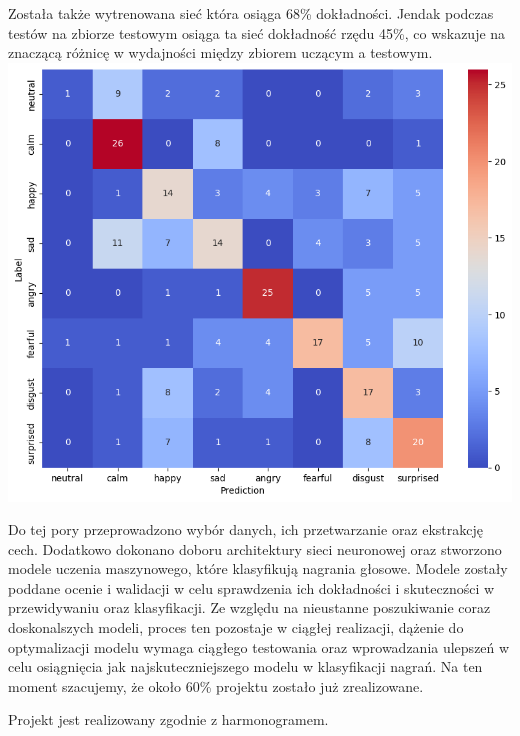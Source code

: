 \documentclass[12pt,titlepage]{article}
\begin{document}
Została także wytrenowana sieć która osiąga 68\% dokładności. Jendak podczas testów na zbiorze testowym osiąga ta sieć dokładność rzędu 45\%, co wskazuje na znaczącą różnicę w wydajności między zbiorem uczącym a testowym.\\

\includegraphics[width=\linewidth]{img/error_matrix.png}

Do tej pory przeprowadzono wybór danych, ich przetwarzanie oraz ekstrakcję cech. Dodatkowo dokonano doboru architektury sieci neuronowej oraz stworzono modele uczenia maszynowego, które klasyfikują nagrania głosowe. Modele zostały poddane ocenie i walidacji w celu sprawdzenia ich dokładności i skuteczności w przewidywaniu oraz klasyfikacji. Ze względu na nieustanne poszukiwanie coraz doskonalszych modeli, proces ten pozostaje w ciągłej realizacji, dążenie do optymalizacji modelu wymaga ciągłego testowania oraz wprowadzania ulepszeń w celu osiągnięcia jak najskuteczniejszego modelu w klasyfikacji nagrań. Na ten moment szacujemy, że około 60\% projektu zostało już zrealizowane.

Projekt jest realizowany zgodnie z harmonogramem.\\

\end{document}
